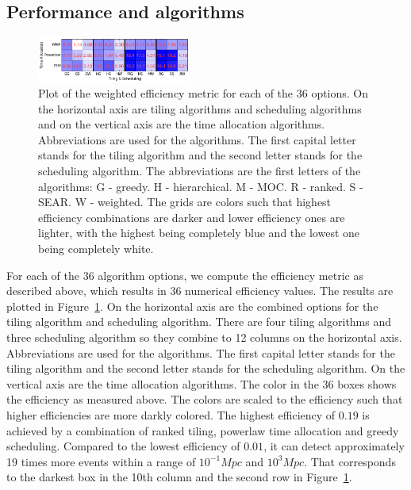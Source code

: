 \documentclass[twocolumn]{aastex62}
\begin{document}
\subsection{Performance and algorithms}
\begin{figure}[t]
\includegraphics[width=0.45\textwidth]{plots/efficiency.png}
\caption{Plot of the weighted efficiency metric for each of the 36 options. On the horizontal axis are tiling algorithms and scheduling algorithms and on the vertical axis are the time allocation algorithms. Abbreviations are used for the algorithms. The first capital letter stands for the tiling algorithm and the second letter stands for the scheduling algorithm. The abbreviations are the first letters of the algorithms: G - greedy. H - hierarchical. M - MOC. R - ranked. S - SEAR. W - weighted. The grids are colors such that highest efficiency combinations are darker and lower efficiency ones are lighter, with the highest being completely blue and the lowest one being completely white.}
\label{fig:eff_metric}
\centering
\end{figure}
For each of the 36 algorithm options, we compute the efficiency metric as described above, which results in 36 numerical efficiency values. The results are plotted in Figure~\ref{fig:eff_metric}. On the horizontal axis are the combined options for the tiling algorithm and scheduling algorithm. There are four tiling algorithms and three scheduling algorithm so they combine to 12 columns on the horizontal axis. Abbreviations are used for the algorithms. The first capital letter stands for the tiling algorithm and the second letter stands for the scheduling algorithm. On the vertical axis are the time allocation algorithms. The color in the 36 boxes shows the efficiency as measured above. The colors are scaled to the efficiency such that higher efficiencies are more darkly colored.
The highest efficiency of $0.19$ is achieved by a combination of ranked tiling, powerlaw time allocation and greedy scheduling. Compared to the lowest efficiency of $0.01$, it can detect approximately 19 times more events within a range of $10^{-1} Mpc$ and $10^3 Mpc$. That corresponds to the darkest box in the 10th column and the second row in Figure~\ref{fig:eff_metric}. 
\end{document}
